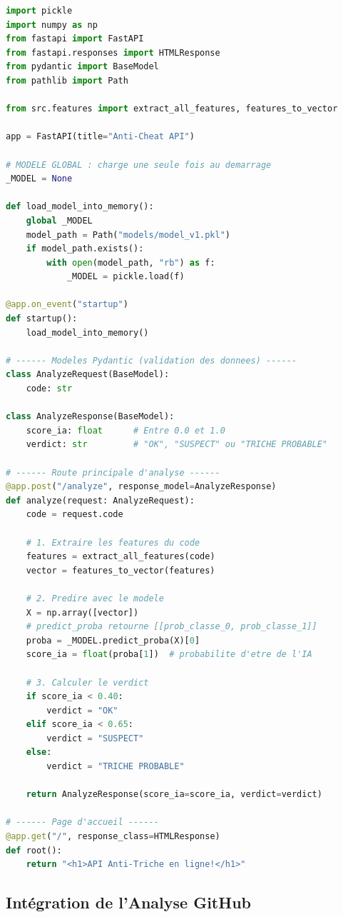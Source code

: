 \documentclass[a4paper,11pt]{article}
\begin{document}
\begin{lstlisting}[language=Python, caption=src/api.py - Structure minimale de l'API]
import pickle
import numpy as np
from fastapi import FastAPI
from fastapi.responses import HTMLResponse
from pydantic import BaseModel
from pathlib import Path

from src.features import extract_all_features, features_to_vector

app = FastAPI(title="Anti-Cheat API")

# MODELE GLOBAL : charge une seule fois au demarrage
_MODEL = None

def load_model_into_memory():
    global _MODEL
    model_path = Path("models/model_v1.pkl")
    if model_path.exists():
        with open(model_path, "rb") as f:
            _MODEL = pickle.load(f)

@app.on_event("startup")
def startup():
    load_model_into_memory()

# ------ Modeles Pydantic (validation des donnees) ------
class AnalyzeRequest(BaseModel):
    code: str

class AnalyzeResponse(BaseModel):
    score_ia: float      # Entre 0.0 et 1.0
    verdict: str         # "OK", "SUSPECT" ou "TRICHE PROBABLE"

# ------ Route principale d'analyse ------
@app.post("/analyze", response_model=AnalyzeResponse)
def analyze(request: AnalyzeRequest):
    code = request.code
    
    # 1. Extraire les features du code
    features = extract_all_features(code)
    vector = features_to_vector(features)
    
    # 2. Predire avec le modele
    X = np.array([vector])
    # predict_proba retourne [[prob_classe_0, prob_classe_1]]
    proba = _MODEL.predict_proba(X)[0]
    score_ia = float(proba[1])  # probabilite d'etre de l'IA
    
    # 3. Calculer le verdict
    if score_ia < 0.40:
        verdict = "OK"
    elif score_ia < 0.65:
        verdict = "SUSPECT"
    else:
        verdict = "TRICHE PROBABLE"
    
    return AnalyzeResponse(score_ia=score_ia, verdict=verdict)

# ------ Page d'accueil ------
@app.get("/", response_class=HTMLResponse)
def root():
    return "<h1>API Anti-Triche en ligne!</h1>"
\end{lstlisting}

\subsection{Intégration de l'Analyse GitHub}
\end{document}
